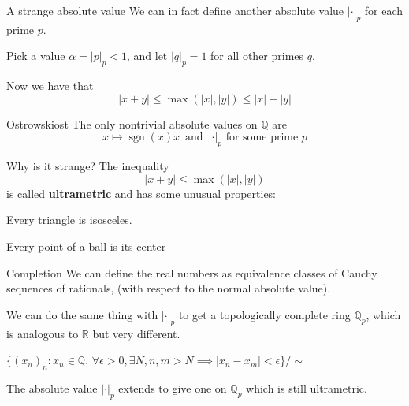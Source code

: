 \documentclass[notheorems]{beamer}
\theoremstyle{plain}
\DeclareMathOperator{\sgn}{sgn}
\newcommand{\terminology}[1]{\textbf{#1}}
\newcommand{\QQ}{\mathbb Q}
\newcommand{\RR}{\mathbb R}
\begin{document}
\begin{frame}{A strange absolute value}
    We can in fact define another absolute value $|\cdot |_p$ for each prime $p$.

    Pick a value $\alpha = |p|_p < 1$, and let $|q|_p=1$ for all other primes $q$.

    Now we have that \[|x+y| \le \max(|x|, |y|) \le |x| + |y|\]


    \begin{theorem}{Ostrowski}{ost}\label{theorem-36}
        The only nontrivial absolute values on \(\QQ\) are%
        \begin{equation*}
            x \mapsto \sgn(x) x\, \text{ and }\, |\cdot|_p \text{ for some prime $p$}
        \end{equation*}
    \end{theorem}
\end{frame}

\begin{frame}{Why is it strange?}
    The inequality \[|x+y| \le \max(|x|, |y|)\] is called \terminology{ultrametric} and has some unusual properties:

    Every triangle is isosceles.


    Every point of a ball is its center


\end{frame}

\begin{frame}{Completion}
    We can define the real numbers as equivalence classes of Cauchy sequences of rationals, (with respect to the normal absolute value).

    We can do the same thing with  $|\cdot |_p$ to get a topologically complete ring $\QQ_p$, which is analogous to $\RR$ but very different.

    \(\{(x_n)_n : x_n \in \QQ,\, \forall \epsilon > 0, \exists N, n,m > N \implies | x_n - x_m| < \epsilon  \}/ \sim\)

    The absolute value $|\cdot|_p$ extends to give one on $\QQ_p$ which is still ultrametric.
\end{frame}
\end{document}
